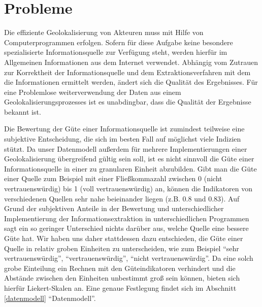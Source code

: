 \section{Probleme}
Die effiziente Geolokalisierung von Akteuren muss mit Hilfe von Computerprogrammen erfolgen. Sofern für diese Aufgabe keine besondere spezialisierte Informationsquelle zur Verfügung steht, werden hierfür im Allgemeinen Informationen aus dem Internet verwendet. Abhängig vom Zutrauen zur Korrektheit der Informationsquelle und dem Extraktionsverfahren mit dem die Informationen ermittelt werden, ändert sich die Qualität des Ergebnisses. Für eine Problemlose weiterverwendung der Daten aus einem Geolokalisierungsprozesses ist es unabdingbar, dass die Qualität der Ergebnisse bekannt ist.

Die Bewertung der Güte einer Informationsquelle ist zumindest teilweise eine subjektive Entscheidung, die sich im besten Fall auf möglichst viele Indizien stützt. Da unser Datenmodell außerdem für mehrere Implementierungen einer Geolokalisierung übergreifend gültig sein soll, ist es nicht sinnvoll die Güte einer Informationsquelle in einer zu granularen Einheit abzubilden. Gibt man die Güte einer Quelle zum Beispiel mit einer Fließkommazahl zwischen 0 (nicht vertrauenswürdig) bis 1 (voll vertrauenswürdig) an, können die Indikatoren von verschiedenen Quellen sehr nahe beieinander liegen (z.B. 0.8 und 0.83). Auf Grund der subjektiven Anteile in der Bewertung und unterschiedlicher Implementierung der Informationsextraktion in unterschiedlichen Programmen sagt ein so geringer Unterschied nichts darüber aus, welche Quelle eine bessere Güte hat. Wir haben uns daher stattdessen dazu entschieden, die Güte einer Quelle in relativ groben Einheiten zu unterscheiden, wie zum Beispiel ``sehr vertrauenswürdig'', ``vertrauenswürdig'', ``nicht vertrauenswürdig''. Da eine solch grobe Einteilung ein Rechnen mit den Güteindikatoren verhindert und die Abstände zwischen den Einheiten unbestimmt groß sein können, bieten sich hierfür Liekert-Skalen an. Eine genaue Festlegung findet sich im Abschnitt \ref{datenmodell} ``Datenmodell''.
